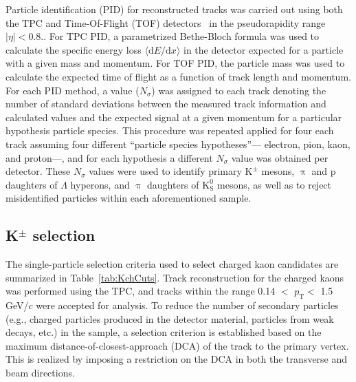 \documentclass[ALICE,manyauthors]{cernphprep}
\newcommand{\pt}{$p_{\mathrm{T}}$\xspace}
\newcommand{\Lam}{$\Lambda$\xspace}
\newcommand{\Kpm}{$\mathrm{K^{\pm}}$\xspace}
\newcommand{\Ks}{$\mathrm{K^{0}_{S}}$\xspace}
\begin{document}
Particle identification (PID) for reconstructed tracks was carried out using both the TPC and Time-Of-Flight (TOF) detectors~\cite{Abelev:2014ffa, Akindinov:2013tea} {\color{red}in the pseudorapidity range $|\eta| < 0.8$.}.  
For TPC PID, a parametrized Bethe-Bloch formula was used to calculate the specific energy loss $\langle \mathrm{d}E/\mathrm{d}x \rangle$ in the detector expected for a particle with a given mass and momentum.  
For TOF PID, the particle mass was used to calculate the expected time of flight as a function of track length and momentum.  
For each PID method, a value ($N_{\sigma}$) was assigned to each track denoting the number of standard deviations between the measured track {\color{red}information and calculated values} {\color{blue}and the expected signal at a given momentum for a particular hypothesis particle species.}  
This procedure was {\color{red}repeated} {\color{blue}applied} for {\color{red}four} {\color{blue}each track assuming four different} {\color{red}``}particle species hypotheses{\color{red}''}--- electron, pion, kaon, and proton---{\color{red},} and for each hypothesis a different $N_{\sigma}$ value was obtained per detector.
{\color{blue}These $N_{\sigma}$ values were used to identify primary \Kpm mesons, $\uppi$ and p daughters of \Lam hyperons, and $\uppi$ daughters of \Ks mesons, as well as to reject misidentified particles within each aforementioned sample.}

\subsection{K$^{\pm}$ selection}
\label{sec:KchSelection}
The single-particle selection criteria used to select charged kaon candidates are summarized in Table~\ref{tab:KchCuts}.
Track reconstruction for the charged kaons was performed using the TPC, and tracks within the range 0.14 $<$ \pt $<$ 1.5 GeV/$c$ were accepted {\color{blue}for analysis}.
To reduce the number of secondary particles (e.g., charged particles produced in the detector material, particles from weak decays, etc.) in the sample, a selection criterion is established {\color{blue}based} on the maximum distance-of-closest-approach (DCA) of the track to the primary vertex.
This is realized by imposing a restriction on the DCA in both the transverse and beam directions.
\end{document}
